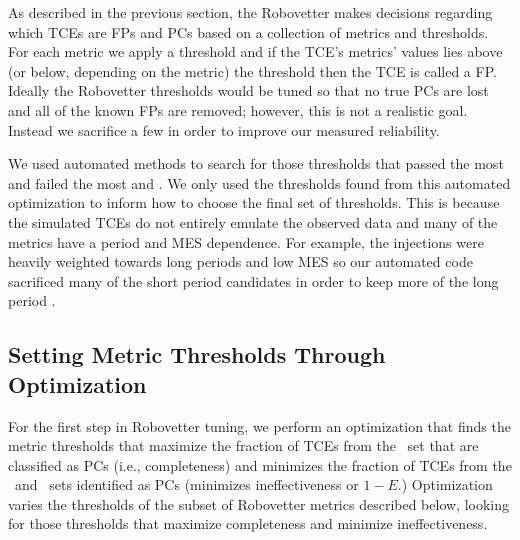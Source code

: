 \label{s:optimize}
As described in the previous section, the Robovetter makes decisions regarding which TCEs are FPs and PCs based on a collection of metrics and thresholds.  For each metric we apply a threshold and if the TCE's metrics' values lies above (or below, depending on the metric) the threshold then the TCE is called a FP.  Ideally the Robovetter thresholds would be tuned so that no true PCs are lost and all of the known FPs are removed; however, this is not a realistic goal.  Instead we sacrifice a few  in order to improve our measured reliability.

We used automated methods to search for those thresholds that passed the most  and failed the most  and . We only used the thresholds found from this automated optimization to inform how to choose the final set of thresholds. This is because the simulated TCEs do not entirely emulate the observed data and many of the metrics have a period and MES dependence.  For example, the injections were heavily weighted towards long periods and low MES so our automated code sacrificed many of the short period candidates in order to keep more of the long period .




\subsection{Setting Metric Thresholds Through Optimization}
\label{s:full_optimize}
For the first step in Robovetter tuning, we perform an optimization that finds the metric thresholds that maximize the fraction of TCEs from the \injtce\ set that are classified as PCs (i.e., completeness) and minimizes the fraction of TCEs from the \scrtce\ and \invtce\ sets identified as PCs (minimizes ineffectiveness or $1-E$.) Optimization varies the thresholds of the subset of Robovetter metrics described below, looking for those thresholds that maximize completeness and minimize ineffectiveness.

